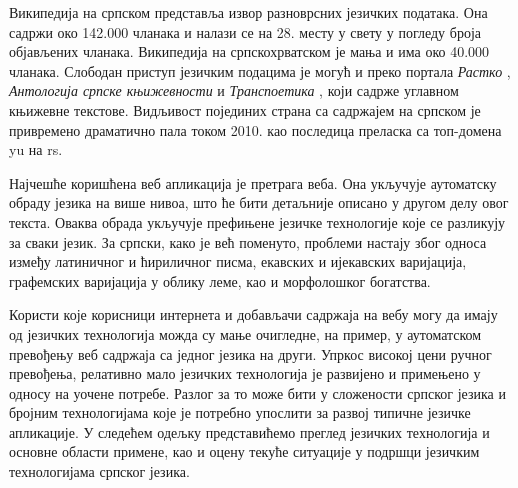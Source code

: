 \begin{multicols}{2}
Википедија на српском представља извор разноврсних језичких података. Она садржи око 142.000 чланака и налази се на  28. месту \cite{WIKI} у свету у погледу броја објављених чланака. Википедија на српскохрватском \cite{SHWIKI}   је мања и  има око 40.000 чланака. Слободан приступ језичким подацима је могућ и преко портала \textit{Растко} \cite{RASTKO},  \textit{Антологија српске књижевности} \cite{ASK} и \textit{Транспоетика} \cite{TRPOET}, који садрже углавном књижевне текстове. 
Видљивост појединих страна са садржајем на српском је привремено драматично пала током 2010. као последица преласка са топ-домена yu на rs. 

Најчешће коришћена веб апликација је претрага веба. Она укључује аутоматску обраду језика на више нивоа, што ће бити детаљније описано у другом делу овог текста.  Оваква обрада укључује префињене језичке технологије које се разликују за сваки језик.  За српски, како је већ поменуто,  проблеми настају због односа између латиничног и ћириличног писма,  екавских и ијекавских варијација, графемских варијација у облику леме, као и морфолошког богатства. 

Користи које корисници интернета и добављачи садржаја на вебу могу да имају од језичких технологија можда су мање очигледне, на пример, у аутоматском превођењу веб садржаја са једног језика на други. Упркос високој цени ручног превођења, релативно мало језичких технологија је развијено и примењено у односу на уочене потребе.  Разлог за то може бити у сложености српског језика и бројним технологијама које је потребно упослити за развој типичне језичке апликације. У следећем одељку представићемо преглед језичких технологија и основне области примене,  као и оцену текуће ситуације у подршци језичким технологијама српског језика.
\end{multicols}

\clearpage

